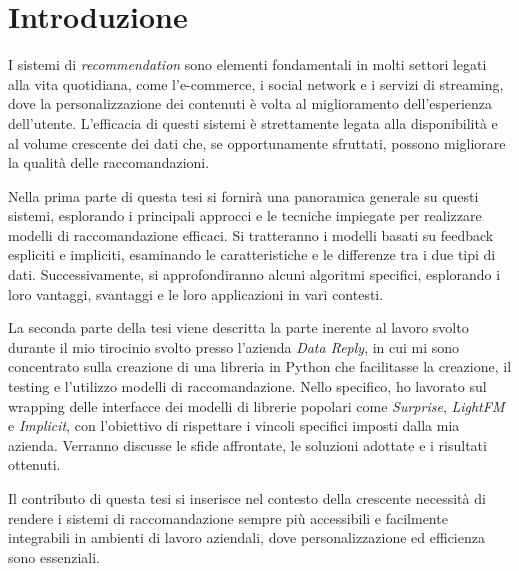 \chapter{Introduzione}

I sistemi di \textit{recommendation} sono elementi fondamentali in molti settori legati alla vita quotidiana, come l'e-commerce, i social network e i servizi di streaming, dove la personalizzazione dei contenuti è volta al miglioramento dell'esperienza dell'utente. L'efficacia di questi sistemi è strettamente legata alla disponibilità e al volume crescente dei dati che, se opportunamente sfruttati, possono migliorare la qualità delle raccomandazioni.

Nella prima parte di questa tesi si fornirà una panoramica generale su questi sistemi, esplorando i principali approcci e le tecniche impiegate per realizzare modelli di raccomandazione efficaci. Si tratteranno i modelli basati su feedback espliciti e impliciti, esaminando le caratteristiche e le differenze tra i due tipi di dati. Successivamente, si approfondiranno alcuni algoritmi specifici, esplorando i loro vantaggi, svantaggi e le loro applicazioni in vari contesti.

La seconda parte della tesi viene descritta la parte inerente al lavoro svolto durante il mio tirocinio svolto presso l'azienda \textit{Data Reply}, in cui mi sono concentrato sulla creazione di una libreria in Python che facilitasse la creazione, il testing e l'utilizzo modelli di raccomandazione. Nello specifico, ho lavorato sul wrapping delle interfacce dei modelli di librerie popolari come \textit{Surprise}, \textit{LightFM} e \textit{Implicit}, con l'obiettivo di rispettare i vincoli specifici imposti dalla mia azienda. Verranno discusse le sfide affrontate, le soluzioni adottate e i risultati ottenuti.

Il contributo di questa tesi si inserisce nel contesto della crescente necessità di rendere i sistemi di raccomandazione sempre più accessibili e facilmente integrabili in ambienti di lavoro aziendali, dove personalizzazione ed efficienza sono essenziali.
